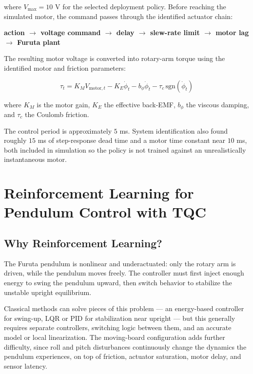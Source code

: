 \documentclass[9pt]{extarticle}
\begin{document}
where $V_{\max}=10$ V for the selected deployment policy. Before reaching
the simulated motor, the command passes through the identified actuator
chain:

\begin{center}
\textbf{
action $\rightarrow$ voltage command $\rightarrow$ delay
$\rightarrow$ slew-rate limit $\rightarrow$ motor lag
$\rightarrow$ Furuta plant
}
\end{center}

The resulting motor voltage is converted into rotary-arm torque using the
identified motor and friction parameters:

\begin{equation}
\boxed{
\tau_t =
K_M V_{\mathrm{motor},t}
-
K_E\dot{\phi}_t
-
b_\phi\dot{\phi}_t
-
\tau_c\,\mathrm{sgn}(\dot{\phi}_t)
}
\label{eq:actuator_torque}
\end{equation}

where $K_M$ is the motor gain, $K_E$ the effective back-EMF, $b_\phi$ the
viscous damping, and $\tau_c$ the Coulomb friction.

The control period is approximately $5$ ms. System identification also
found roughly $15$ ms of step-response dead time and a motor time constant
near $10$ ms, both included in simulation so the policy is not trained
against an unrealistically instantaneous motor.


\section{Reinforcement Learning for Pendulum Control with TQC}

\subsection{Why Reinforcement Learning?}

The Furuta pendulum is nonlinear and underactuated: only the rotary arm is
driven, while the pendulum moves freely. The controller must first inject
enough energy to swing the pendulum upward, then switch behavior to
stabilize the unstable upright equilibrium.

Classical methods can solve pieces of this problem — an energy-based
controller for swing-up, LQR or PID for stabilization near upright — but
this generally requires separate controllers, switching logic between
them, and an accurate model or local linearization. The moving-board
configuration adds further difficulty, since roll and pitch disturbances
continuously change the dynamics the pendulum experiences, on top of
friction, actuator saturation, motor delay, and sensor latency.
\end{document}
